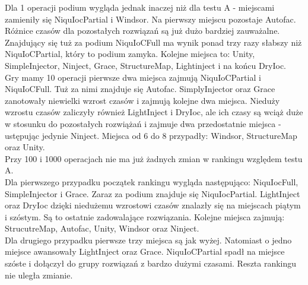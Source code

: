 \documentclass[12pt]{article}
\begin{document}
Dla 1 operacji podium wygląda jednak inaczej niż dla testu A - miejscami zamieniły się NiquIocPartial i Windsor. Na pierwszy miejscu pozostaje Autofac. Różnice czasów dla pozostałych rozwiązań są już dużo bardziej zauważalne. Znajdujący się tuż za podium NiquIoCFull ma wynik ponad trzy razy słabszy niż NiquIoCPartial, który to podium zamyka. Kolejne miejsca to: Unity, SimpleInjector, Ninject, Grace, StructureMap, Lightinject i na końcu DryIoc.\\
Gry mamy 10 operacji pierwsze dwa miejsca zajmują NiquIoCPartial i NiquIoCFull. Tuż za nimi znajduje się Autofac. SimplyInjector oraz Grace zanotowały niewielki wzrost czasów i zajmują kolejne dwa miejsca. Nieduży wzrostu czasów zaliczyły również LightInject i DryIoc, ale ich czasy są wciąż duże w stosunku do pozostałych rozwiążań i zajmuje dwa przedostatnie miejsca - ustępując jedynie Ninject. Miejsca od 6 do 8 przypadły: Windsor, StructureMap oraz Unity.\\
Przy 100 i 1000 operacjach nie ma już żadnych zmian w rankingu względem testu A.\\
Dla pierwszego przypadku początek rankingu wygląda następująco: NiquIocFull, SimpleInjector i Grace. Zaraz za podium znajduje się NiquIocPartial. LightInject oraz DryIoc dzięki niedużemu wzrostowi czasów znalazły się na miejscach piątym i szóstym. Są to ostatnie zadowalające rozwiązania. Kolejne miejsca zajmują: StrucutreMap, Autofac, Unity, Windsor oraz Ninject.\\
Dla drugiego przypadku pierwsze trzy miejsca są jak wyżej. Natomiast o jedno miejsce awansowały LightInject oraz Grace. NiquIoCPartial spadł na miejsce szóste i dołączył do grupy rozwiązań z bardzo dużymi czasami. Reszta rankingu nie uległa zmianie.
\end{document}
